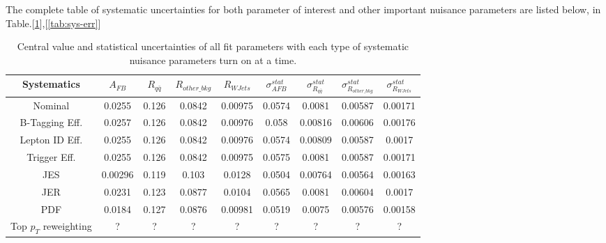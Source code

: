 \documentclass{cmspaperpdf}
\begin{document}
The complete table of systematic uncertainties for both parameter of interest and other important nuisance parameters are listed below, in Table.[\ref{tab:sys-full}],[\ref{tab:sys-err}]

\begin{table}[htb]
\centering
\label{tab:sys-full}
\begin{tabular}{ccccccccc}
Systematics &      $A_{FB}$ &   $R_{q\bar{q}}$ & $R_{other\_bkg}$ &  $R_{WJets}$ & $\sigma_{AFB}^{stat}$ & $\sigma_{R_{q\bar{q}}}^{stat}$ & $\sigma_{R_{other\_bkg}}^{stat}$ & $\sigma_{R_{WJets}}^{stat}$ \\
\hline
Nominal           &   0.0255 &  0.126 &      0.0842 &  0.00975 &       0.0574 &        0.0081 &              0.00587 &          0.00171 \\
\hline
B-Tagging Eff. &   0.0257 &  0.126 &      0.0842 &  0.00976 &        0.058 &       0.00816 &              0.00606 &          0.00176 \\
Lepton ID Eff.    &   0.0255 &  0.126 &      0.0842 &  0.00976 &       0.0574 &       0.00809 &              0.00587 &           0.0017 \\
Trigger Eff.  &   0.0255 &  0.126 &      0.0842 &  0.00975 &       0.0575 &        0.0081 &              0.00587 &          0.00171 \\
\hline
JES               &  0.00296 &  0.119 &       0.103 &   0.0128 &       0.0504 &       0.00764 &              0.00564 &          0.00163 \\
JER               &   0.0231 &  0.123 &      0.0877 &   0.0104 &       0.0565 &        0.0081 &              0.00604 &           0.0017 \\
PDF       &   0.0184 &  0.127 &      0.0876 &  0.00981 &       0.0519 &        0.0075 &              0.00576 &          0.00158 \\
\hline
Top $p_T$ reweighting &   ? &  ?  &      ?  &  ?  &       ?  &        ?  &               ?  &           ?  \\
\hline
\end{tabular}
\caption{Central value and statistical uncertainties of all fit parameters with each type of systematic nuisance parameters turn on at a time.}
\end{table}
\end{document}
